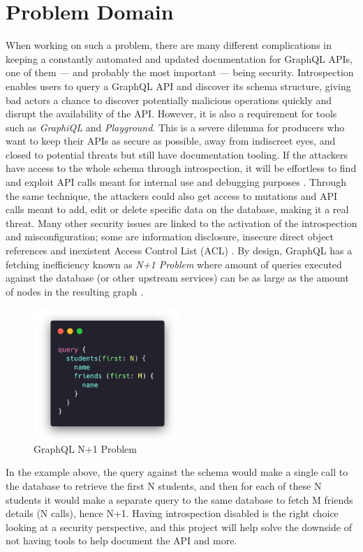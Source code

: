 \section*{Problem Domain}
\label{s:Problem-Domain}
When working on such a problem, there are many different complications in
keeping a constantly automated and updated documentation for GraphQL APIs, one
of them --- and probably the most important --- being security. Introspection
enables users to query a GraphQL API and discover its schema structure, giving
bad actors a chance to discover potentially malicious operations
\citep{khalilWhyYouShould2021} quickly and disrupt the availability of the API.
However, it is also a requirement for tools such as \textit{GraphiQL} and
\textit{Playground}. This is a severe dilemma for producers who want to keep
their APIs as secure as possible, away from indiscreet eyes, and closed to
potential threats but still have documentation tooling. If the attackers have
access to the whole schema through introspection, it will be effortless to find
and exploit API calls meant for internal use and debugging purposes
\citep{rizwanGraphQLCommonVulnerabilities2021}. Through the same technique, the
attackers could also get access to mutations and API calls meant to add, edit or
delete specific data on the database, making it a real threat. Many other
security issues are linked to the activation of the introspection and
misconfiguration; some are information disclosure, insecure direct object
references and inexistent Access Control List (ACL) \citep{
yeswehackHowExploitGraphQL2021}. By design, GraphQL has a fetching inefficiency
known as \textit{N+1 Problem} where amount of queries executed against the
database (or other upstream services) can be as large as the amount of nodes in
the resulting graph \citep{ graphqlbypopSuppressingProblemGraphQL2020}.
\begin{figure}[H]
  \centering
  \includegraphics[width=0.5\textwidth]{figures/code/n+1}
  \caption{GraphQL N+1 Problem}
  \label{f:GraphQL-N1-Problem}
\end{figure}
In the example above, the query against the schema would make a single call to
the database to retrieve the first N students, and then for each of these N
students it would make a separate query to the same database to fetch M friends
details (N calls), hence N+1. Having introspection disabled is the right choice
looking at a security perspective, and this project will help solve the downside
of not having tools to help document the API and more.

